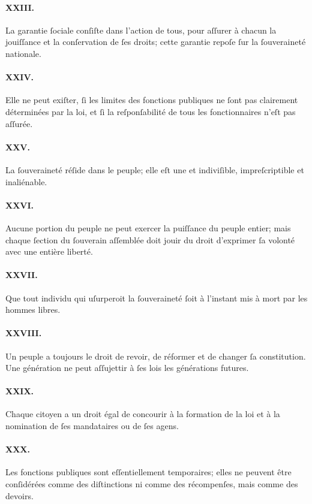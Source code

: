 \documentclass[10pt]{article}
\begin{document}
\paragraph*{XXIII.}La garantie ſociale conſiſte dans l'action de tous, pour aſſurer à chacun la jouiſſance et la conſervation de ſes droits; cette garantie repoſe ſur la ſouveraineté nationale.
\paragraph*{XXIV.}Elle ne peut exiſter, ſi les limites des fonctions publiques ne ſont pas clairement déterminées par la loi, et ſi la reſponſabilité de tous les fonctionnaires n'eſt pas aſſurée.
\paragraph*{XXV.}La ſouveraineté réſide dans le peuple; elle eſt une et indiviſible, impreſcriptible et inaliénable.
\paragraph*{XXVI.}Aucune portion du peuple ne peut exercer la puiſſance du peuple entier; mais chaque ſection du ſouverain aſſemblée doit jouir du droit d'exprimer ſa volonté avec une entière liberté.
\paragraph*{XXVII.}Que tout individu qui uſurperoit la ſouveraineté ſoit à l'instant mis à mort par les hommes libres.
\paragraph*{XXVIII.}Un peuple a toujours le droit de revoir, de réformer et de changer ſa constitution. Une génération ne peut aſſujettir à ſes lois les générations futures.
\paragraph*{XXIX.}Chaque citoyen a un droit égal de concourir à la formation de la loi et à la nomination de ſes mandataires ou de ſes agens.
\paragraph*{XXX.}Les fonctions publiques sont eſſentiellement temporaires; elles ne peuvent être conſidérées comme des diſtinctions ni comme des récompenſes, mais comme des devoirs.
\end{document}
